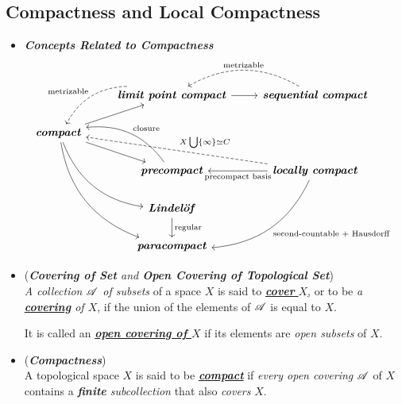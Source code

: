 \documentclass[11pt]{article}
\begin{document}
\subsection{Compactness and Local Compactness}
\begin{itemize}
\item  \emph{\textbf{Concepts Related to Compactness}}
\[
  \begin{tikzcd}
   &  \arrow[dl, swap, bend right, dashed, "\text{metrizable}"]   \text{\emph{\textbf{limit point compact}}} \arrow{r}{} & \arrow[l, bend right, dashed, swap,  "\text{metrizable}"]  \text{\emph{\textbf{sequential compact}}}\\
  \text{\emph{\textbf{compact}}}  \arrow{ur}{}  \arrow{dr}{} \arrow[ddr, bend right] \arrow[dddr, bend right] & &\\
  & \arrow[bend right, swap]{ul}{\text{closure}}  \text{\emph{\textbf{precompact}}}    & \arrow{l}{\text{precompact basis}}   \text{\emph{\textbf{locally compact}}}  \arrow[ull,  dashed,  swap, "X \bigcup \set{\infty} \simeq C"]     \arrow[ddl,   bend left,  "\text{second-countable $+$ Hausdorff}"]  \\
 & \text{\emph{\textbf{Lindel{\"o}f}}} \arrow{d}{\text{regular}} & &\\
 & \text{\emph{\textbf{paracompact}}} &  &
  \end{tikzcd}
\] 

\item \begin{definition} (\emph{\textbf{Covering of Set} and \textbf{Open Covering of Topological Set}})\\
\emph{A collection ${\mathscr A}$ of subsets} of a space $X$ is said to \underline{\emph{\textbf{cover}} $X$,} or to be \emph{a \underline{\textbf{covering}} of $X$}, if the union of the elements of ${\mathscr A}$ is equal to $X$. 

It is called an \underline{\emph{\textbf{open covering of $X$}}} if its elements are \emph{open subsets} of $X$.
\end{definition}

\item \begin{definition} (\emph{\textbf{Compactness}})\\
A topological space $X$ is said to be \underline{\emph{\textbf{compact}}} if \emph{every open covering} ${\mathscr A}$ of $X$ contains a \emph{\textbf{finite} subcollection} that also \emph{covers} $X$.
\end{definition}


\end{itemize}
\end{document}
